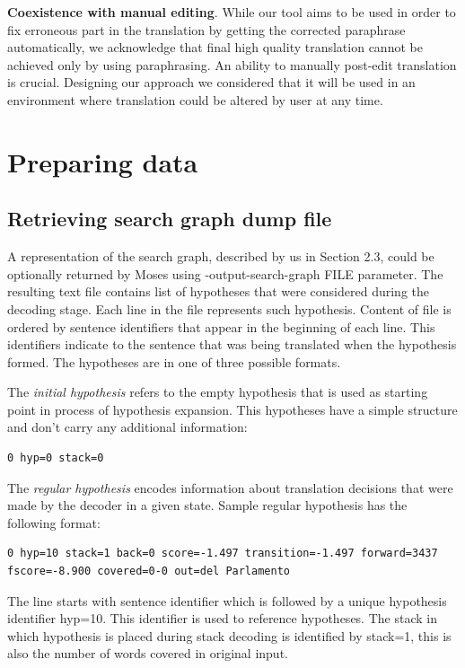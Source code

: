 \textbf{Coexistence with manual editing}. While our tool aims to be used in order to fix erroneous part in the translation by getting the corrected paraphrase automatically, we acknowledge that final high quality translation cannot be achieved only by using paraphrasing. An ability to manually post-edit translation is crucial. Designing our approach we considered that it will be used in an environment where translation could be altered by user at any time.  

\section{Preparing data}

\subsection{Retrieving search graph dump file}

A representation of the search graph, described by us in Section 2.3, could be optionally returned by Moses using \textsf{-output-search-graph FILE} parameter. The resulting text file contains list of hypotheses that were considered during the decoding stage. Each line in the file represents such hypothesis. Content of file is ordered by sentence identifiers that appear in the beginning of each line. This identifiers indicate to the sentence that was being translated when the hypothesis formed. The hypotheses are in one of three possible formats.

The \textit{initial hypothesis} refers to the empty hypothesis that is used as starting point in process of hypothesis expansion. This hypotheses have a simple structure and don't carry any additional information:

\begin{verbatim}
0 hyp=0 stack=0
\end{verbatim}

The \textit{regular hypothesis} encodes information about translation decisions that were made by the decoder in a given state. Sample regular hypothesis has the following format:

\begin{verbatim}
0 hyp=10 stack=1 back=0 score=-1.497 transition=-1.497 forward=3437
fscore=-8.900 covered=0-0 out=del Parlamento
\end{verbatim}

The line starts with sentence identifier which is followed by a unique hypothesis identifier \textsf{hyp=10}. This identifier is used to reference hypotheses. The stack in which hypothesis is placed during stack decoding is identified by \textsf{stack=1}, this is also the number of words covered in original input.


